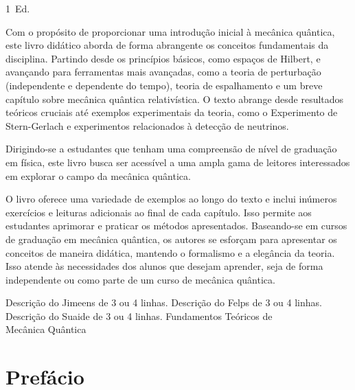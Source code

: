 \documentclass{header}
\begin{document}

{1\textordfeminine\ Ed.} %
{Com o propósito de proporcionar uma introdução inicial à mecânica quântica, este livro didático aborda de forma abrangente os conceitos fundamentais da disciplina. Partindo desde os princípios básicos, como espaços de Hilbert, e avançando para ferramentas mais avançadas, como a teoria de perturbação (independente e dependente do tempo), teoria de espalhamento e um breve capítulo sobre mecânica quântica relativística. O texto abrange desde resultados teóricos cruciais até exemplos experimentais da teoria, como o Experimento de Stern-Gerlach e experimentos relacionados à detecção de neutrinos.

Dirigindo-se a estudantes que tenham uma compreensão de nível de graduação em física, este livro busca ser acessível a uma ampla gama de leitores interessados em explorar o campo da mecânica quântica.

O livro oferece uma variedade de exemplos ao longo do texto e inclui inúmeros exercícios e leituras adicionais ao final de cada capítulo. Isso permite aos estudantes aprimorar e praticar os métodos apresentados. Baseando-se em cursos de graduação em mecânica quântica, os autores se esforçam para apresentar os conceitos de maneira didática, mantendo o formalismo e a elegância da teoria. Isso atende às necessidades dos alunos que desejam aprender, seja de forma independente ou como parte de um curso de mecânica quântica.} %
{Descrição do Jimeens de 3 ou 4 linhas.} %
{Descrição do Felps de 3 ou 4 linhas.} %
{Descrição do Suaide de 3 ou 4 linhas.} %
{Fundamentos Teóricos de\\ \medskip Mecânica Quântica}



\frontmatter

\pagestyle{toc}

\tableofcontents


\chapter*{\hspace{0.8cm}Prefácio}
\end{document}
